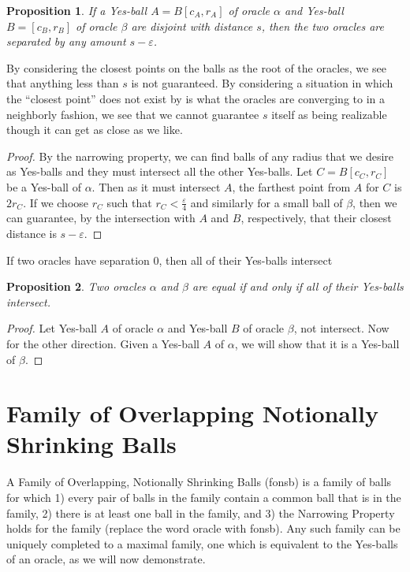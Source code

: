 \documentclass[12pt]{article}
\newtheorem{proposition}{Proposition}[section]
\begin{document}
\begin{proposition}
If a Yes-ball $A = B[c_A, r_A]$ of oracle $\alpha$ and Yes-ball $B=[c_B, r_B]$ of oracle $\beta$ are disjoint with distance $s$, then the two oracles are separated by any amount $s-\varepsilon$.
\end{proposition}

By considering the closest points on the balls as the root of the oracles, we see that anything less than $s$ is not guaranteed. By considering a situation in which the ``closest point'' does not exist by is what the oracles are converging to in a neighborly fashion, we see that we cannot guarantee $s$ itself as being realizable though it can get as close as we like. 

\begin{proof}
    By the narrowing property, we can find balls of any radius that we desire as Yes-balls and they must intersect all the other Yes-balls. Let $C = B[c_C, r_C]$ be a Yes-ball of $\alpha$. Then as it must intersect $A$, the farthest point from $A$ for $C$ is $2r_C$. If we choose $r_C$ such that $r_C < \frac{\varepsilon}{4}$ and similarly for a small ball of $\beta$, then we can guarantee, by the intersection with $A$ and $B$, respectively, that their closest distance is $s - \varepsilon$. 
\end{proof}

If two oracles have separation 0, then all of their Yes-balls intersect

\begin{proposition}
    Two oracles $\alpha$ and $\beta$ are equal if and only if all of their Yes-balls intersect. 
\end{proposition}

\begin{proof}
    Let Yes-ball $A$ of oracle $\alpha$ and Yes-ball $B$ of oracle $\beta$, not intersect. 
    Now for the other direction. 
    Given a Yes-ball $A$ of $\alpha$, we will show that it is a Yes-ball of $\beta$. 
\end{proof}




\section{Family of Overlapping Notionally Shrinking Balls}

A Family of Overlapping, Notionally Shrinking Balls (fonsb) is a family of balls for which 1) every pair of balls in the family contain a common ball that is in the family, 2) there is at least one ball in the family, and 3) the Narrowing Property holds for the family (replace the word oracle with fonsb). Any such family can be uniquely completed to a maximal family, one which is equivalent to the Yes-balls of an oracle, as we will now demonstrate. 
\end{document}
